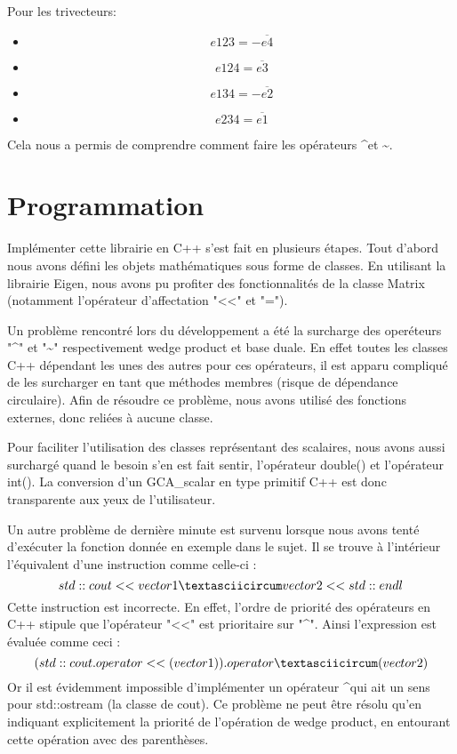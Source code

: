 \documentclass[12pt]{article}
\begin{document}
Pour les trivecteurs: 
\begin{itemize}
\item $$e123=-\overline{e4} $$ \item $$e124=\overline{e3} $$ \item $$e134=-\overline{e2} $$ \item $$e234=\overline{e1}$$
\end{itemize}

Cela nous a permis de comprendre comment faire les opérateurs \textasciicircum  et \textasciitilde.


\section{Programmation}
Implémenter cette librairie en C++ s'est fait en plusieurs étapes. Tout d'abord nous avons défini les objets mathématiques sous forme de classes.
En utilisant la librairie Eigen, nous avons pu profiter des fonctionnalités de la classe Matrix (notamment l'opérateur d'affectation "<<" et "=").

Un problème rencontré lors du développement a été la surcharge des operéteurs "\textasciicircum" et "\textasciitilde" respectivement wedge product et base duale.
En effet toutes les classes C++ dépendant les unes des autres pour ces opérateurs, il est apparu compliqué de les surcharger en tant que méthodes membres (risque de dépendance circulaire).
Afin de résoudre ce problème, nous avons utilisé des fonctions externes, donc reliées à aucune classe.

Pour faciliter l'utilisation des classes représentant des scalaires, nous avons aussi surchargé quand le besoin s'en est fait sentir, l'opérateur double() et l'opérateur int(). La conversion d'un GCA\_scalar en type primitif C++ est donc transparente aux yeux de l'utilisateur. 

Un autre problème de dernière minute est survenu lorsque nous avons tenté d'exécuter la fonction donnée en exemple dans le sujet.
Il se trouve à l'intérieur l'équivalent d'une instruction comme celle-ci :
$$ std::cout << vector1 \textasciicircum vector2 << std::endl$$
Cette instruction est incorrecte. En effet, l'ordre de priorité des opérateurs en C++ stipule que l'opérateur "<<" est prioritaire sur "\textasciicircum ". Ainsi l'expression est évaluée comme ceci :
$$ (std::cout.operator<<(vector1)).operator\textasciicircum(vector2)$$
Or il est évidemment impossible d'implémenter un opérateur \textasciicircum qui ait un sens pour std::ostream (la classe de cout).
Ce problème ne peut être résolu qu'en indiquant explicitement la priorité de l'opération de wedge product, en entourant cette opération avec des parenthèses.
\end{document}
